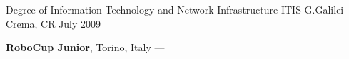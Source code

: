 
\begin{cventries}
  \cventry
    {Degree of Information Technology and Network Infrastructure} %
    {ITIS G.Galilei} %
    {Crema, CR} %
    {July 2009} %
    {
      \begin{cvitems} %
         \item {\textbf{RoboCup Junior}, Torino, Italy --- }
         \vspace{0.5mm}
      \end{cvitems}
    }
\end{cventries}
